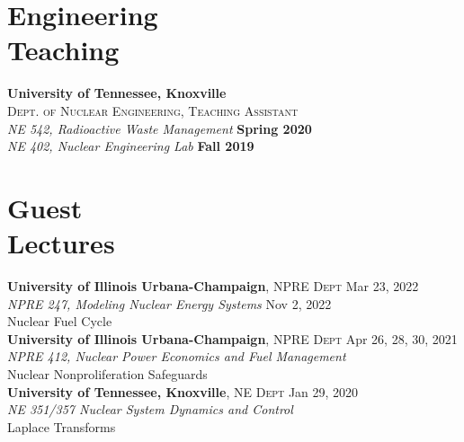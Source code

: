 \documentclass[margin,line]{resume}
\begin{document}
\begin{resume}
    \section{\mysidestyle Engineering\\Teaching}
    \textbf{University of Tennessee, Knoxville}\\
    \textsc{Dept. of Nuclear Engineering, Teaching Assistant}\\
               \textsl{NE 542, Radioactive Waste Management} \hfill \textbf{Spring 2020}\\
               \textsl{NE 402, Nuclear Engineering Lab} \hfill \textbf{Fall 2019}
               \vspace{2mm}

    \section{\mysidestyle Guest\\Lectures}
    \textbf{University of Illinois Urbana-Champaign}, \textsc{NPRE Dept} \hfill Mar 23, 2022\\
    \textsl{NPRE 247, Modeling Nuclear Energy Systems} \hfill Nov 2, 2022\\
        Nuclear Fuel Cycle\\
    \textbf{University of Illinois Urbana-Champaign}, \textsc{NPRE Dept} \hfill Apr 26, 28, 30, 2021\\
    \textsl{NPRE 412, Nuclear Power Economics and Fuel Management} \\
        Nuclear Nonproliferation Safeguards\\
    \textbf{University of Tennessee, Knoxville}, \textsc{NE Dept} \hfill Jan 29, 2020\\
    \textsl{NE 351/357 Nuclear System Dynamics and Control} \\
        Laplace Transforms\\

\end{resume}
\end{document}
